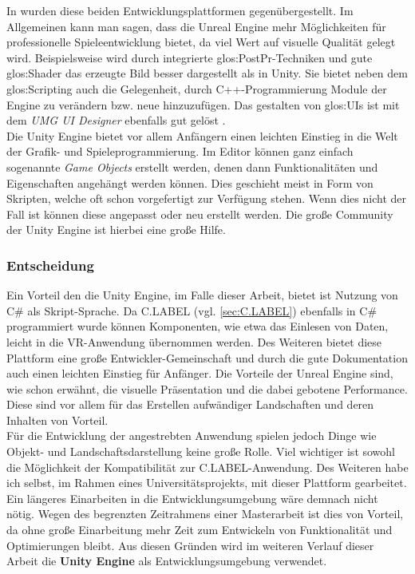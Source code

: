 In \cite{bib:UEvsUE4} wurden diese beiden Entwicklungsplattformen gegenübergestellt. Im Allgemeinen kann man sagen, dass die Unreal Engine mehr Möglichkeiten für professionelle Spieleentwicklung bietet, da viel Wert auf visuelle Qualität gelegt wird. Beispielsweise wird durch integrierte \gls{glos:PostPr}-Techniken und gute \gls{glos:Shader} das erzeugte Bild besser dargestellt als in Unity. Sie bietet neben dem \gls{glos:Scripting} auch die Gelegenheit, durch C++-Programmierung Module der Engine zu verändern bzw. neue hinzuzufügen. Das gestalten von \glspl{glos:UI} ist mit dem \textit{UMG UI Designer} ebenfalls gut gelöst .\\

Die Unity Engine bietet vor allem Anfängern einen leichten Einstieg in die Welt der Grafik- und Spieleprogrammierung. Im Editor können ganz einfach sogenannte \textit{Game Objects} erstellt werden, denen dann Funktionalitäten und Eigenschaften angehängt werden können. Dies geschieht meist in Form von Skripten, welche oft schon vorgefertigt zur Verfügung stehen. Wenn dies nicht der Fall ist können diese angepasst oder neu erstellt werden. Die große Community der Unity Engine ist hierbei eine große Hilfe.

\subsubsection{Entscheidung}
\label{sec:UnityDecision}
Ein Vorteil den die Unity Engine, im Falle dieser Arbeit, bietet ist Nutzung von C\# als Skript-Sprache. Da C.LABEL (vgl. \ref{sec:C.LABEL}) ebenfalls in C\# programmiert wurde können Komponenten, wie etwa das Einlesen von Daten, leicht in die VR-Anwendung übernommen werden. Des Weiteren bietet diese Plattform eine große Entwickler-Gemeinschaft und durch die gute Dokumentation auch einen leichten Einstieg für Anfänger. Die Vorteile der Unreal Engine sind, wie schon erwähnt, die visuelle Präsentation und die dabei gebotene Performance. Diese sind vor allem für das Erstellen aufwändiger Landschaften und deren Inhalten von Vorteil. \\

Für die Entwicklung der angestrebten Anwendung spielen jedoch Dinge wie Objekt- und Landschaftsdarstellung keine große Rolle. Viel wichtiger ist sowohl die Möglichkeit der Kompatibilität zur C.LABEL-Anwendung. Des Weiteren habe ich selbst, im Rahmen eines Universitätsprojekts, mit dieser Plattform gearbeitet. Ein längeres Einarbeiten in die Entwicklungsumgebung wäre demnach nicht nötig. Wegen des begrenzten Zeitrahmens einer Masterarbeit ist dies von Vorteil, da ohne große Einarbeitung mehr Zeit zum Entwickeln von Funktionalität und Optimierungen bleibt. Aus diesen Gründen wird im weiteren Verlauf dieser Arbeit die \textbf{Unity Engine} als Entwicklungsumgebung verwendet.

